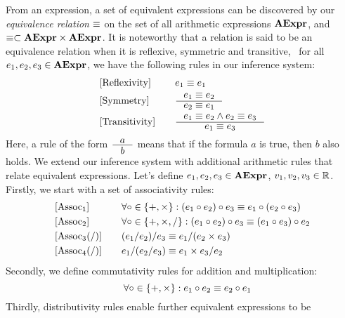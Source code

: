 From an expression, a set of equivalent expressions can be discovered by our
\emph{equivalence relation} $\equiv$ on the set of all arithmetic expressions
$\mathbf{AExpr}$, and $\equiv \subset \mathbf{AExpr}\times\mathbf{AExpr}$.  It is noteworthy
that a relation is said to be an equivalence relation when it is reflexive,
symmetric and transitive, \ie~for all $e_1, e_2, e_3 \in \mathbf{AExpr}$, we
have the following rules in our inference system:
\begin{equation}
    \begin{aligned}{}
        & [\mathrm{Reflexivity}] & \quad &
            e_1 \eqrel e_1 \\
        & [\mathrm{Symmetry}] & \quad &
            \inference{e_1 \eqrel e_2}{e_2 \eqrel e_1} \\
        & [\mathrm{Transitivity}] & \quad &
            \inference{e_1 \eqrel e_2 \wedge e_2 \eqrel e_3}{e_1 \eqrel e_3}
    \end{aligned}
    \label{so:eq:equivalence_relation}
\end{equation}
Here, a rule of the form $\inference{a}{b}$ means that if the formula $a$ is
true, then $b$ also holds.  We extend our inference system with additional
arithmetic rules that relate equivalent expressions.  Let's define $e_1, e_2,
e_3 \in \mathbf{AExpr}$, $v_1, v_2, v_3 \in \mathbb{R}$.  Firstly, we start with a set
of associativity rules:
\begin{equation}
    \begin{aligned}{}
        & [\mathrm{Assoc}_1] & \quad &
            \forall \circ \in \{ +, \times \}:
            (e_1 \circ e_2) \circ e_3 \equiv e_1 \circ (e_2 \circ e_3) \\
        & [\mathrm{Assoc}_2] & \quad &
            \forall \circ \in \{ +, \times, / \}:
            (e_1 \circ e_2) \circ e_3 \equiv (e_1 \circ e_3) \circ e_2 \\
        & [\mathrm{Assoc}_3 (/)] & \quad &
            (e_1 / e_2) / e_3 \equiv e_1 / (e_2 \times e_3) \\
        & [\mathrm{Assoc}_4 (/)] & \quad &
            e_1 / (e_2 / e_3) \equiv e_1 \times e_3 / e_2
    \end{aligned}
\end{equation}
Secondly, we define commutativity rules for addition and multiplication:
\begin{equation}
    [\mathrm{Commut}] \quad
    \forall \circ \in \{ +, \times \}: e_1 \circ e_2 \eqrel e_2 \circ e_1
\end{equation}
Thirdly, distributivity rules enable further equivalent expressions to be
